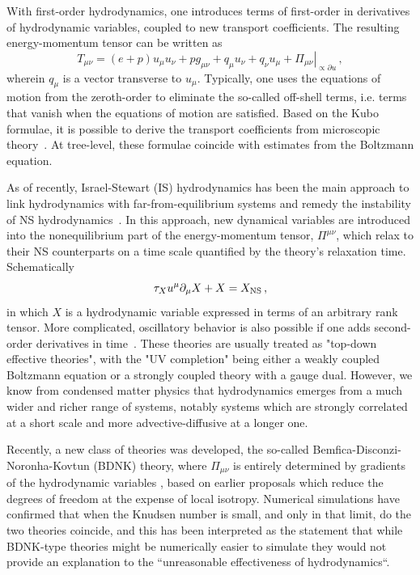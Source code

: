\documentclass[12pt,onecolumn,showpacs,amssymb,aps,nofootinbib,floatfix]{revtex4-2}
\begin{document}
	With first-order hydrodynamics, one introduces terms of first-order in derivatives of hydrodynamic variables, coupled to new transport coefficients. The resulting energy-momentum tensor can be written as
	\begin{equation}
		\label{eq:gentensor}
		T_{\mu \nu} = (e+p)u_\mu u_\nu +pg_{\mu \nu}+q_\mu u_\nu+q_\nu u_\mu +\left. \Pi_{\mu \nu}\right|_{\propto \partial u}\,,
	\end{equation}
	wherein $q_\mu$ is a vector transverse to $u_\mu$.
	Typically, one uses the equations of motion from the zeroth-order to eliminate the so-called off-shell terms, i.e. terms that vanish when the equations of motion are satisfied. Based on the Kubo formulae, it is possible to derive the transport coefficients from microscopic theory~\cite{jeon}.   At tree-level, these formulae coincide with estimates from the Boltzmann equation.
	
	As of recently, Israel-Stewart (IS) hydrodynamics has been the main approach to link hydrodynamics with far-from-equilibrium systems and remedy the instability of NS hydrodynamics~\cite{IsraelStewart}. In this approach, new dynamical variables are introduced into the nonequilibrium part of the energy-momentum tensor, $\Pi^{\mu\nu}$, which relax to their NS counterparts on a time scale quantified by the theory's relaxation time. Schematically
	\begin{equation}
		\label{iseom-general}
		\tau_X u^\mu \partial_\mu  X + X = X_{\rm NS}\,,
	\end{equation}
	in which $X$ is a hydrodynamic variable expressed in terms of an arbitrary rank tensor.  More complicated, oscillatory behavior is also possible if one adds second-order derivatives in time~\cite{janik}. These theories are usually treated as "top-down effective theories", with the "UV completion" being either a weakly coupled Boltzmann equation or a strongly coupled theory with a gauge dual.   However, we know from condensed matter physics \cite{trachenko} that hydrodynamics emerges from a much wider and richer range of systems, notably systems which are strongly correlated at a short scale and more advective-diffusive at a longer one.
	
	Recently, a new class of theories was developed, the so-called Bemfica-Disconzi-Noronha-Kovtun (BDNK) theory, where $\Pi_{\mu \nu}$ is entirely determined by gradients of the hydrodynamic variables \cite{Bemfica:2017wps,kovtun,kovtun2,bdnk,Bemfica:2020zjp,spal}, based on earlier proposals \cite{yarom,biro,biro2} which reduce the degrees of freedom at the expense of local isotropy. \color{black}
Numerical simulations \cite{bantilan} have confirmed that when the Knudsen number is small, and only in that limit, do the two theories coincide, and this has been interpreted as the statement that while BDNK-type theories might be numerically easier to simulate they would not provide an explanation to the ``unreasonable effectiveness of hydrodynamics``.\color{black}
\end{document}

